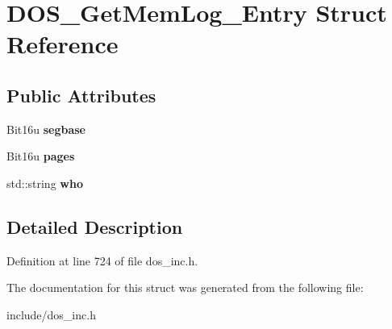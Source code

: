 \hypertarget{structDOS__GetMemLog__Entry}{\section{D\-O\-S\-\_\-\-Get\-Mem\-Log\-\_\-\-Entry Struct Reference}
\label{structDOS__GetMemLog__Entry}
}
\subsection*{Public Attributes}
\begin{DoxyCompactItemize}
\item 
\hypertarget{structDOS__GetMemLog__Entry_ae0b40132debcc642571b174128f14a0c}{Bit16u {\bfseries segbase}}\label{structDOS__GetMemLog__Entry_ae0b40132debcc642571b174128f14a0c}

\item 
\hypertarget{structDOS__GetMemLog__Entry_a1687425bea21c2dba1d7dcf5137ac5e3}{Bit16u {\bfseries pages}}\label{structDOS__GetMemLog__Entry_a1687425bea21c2dba1d7dcf5137ac5e3}

\item 
\hypertarget{structDOS__GetMemLog__Entry_ad8a1936e9a6a49aa924a0fc9e585d18f}{std\-::string {\bfseries who}}\label{structDOS__GetMemLog__Entry_ad8a1936e9a6a49aa924a0fc9e585d18f}

\end{DoxyCompactItemize}


\subsection{Detailed Description}


Definition at line 724 of file dos\-\_\-inc.\-h.



The documentation for this struct was generated from the following file\-:\begin{DoxyCompactItemize}
\item 
include/dos\-\_\-inc.\-h\end{DoxyCompactItemize}
